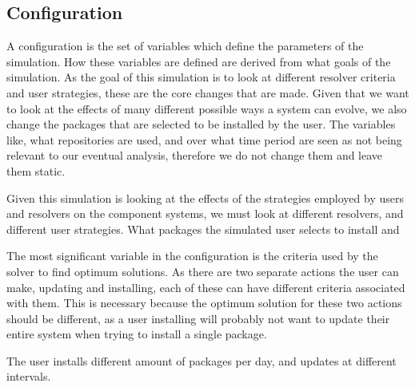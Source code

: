 



\subsection{Configuration}
A configuration is the set of variables which define the parameters of the simulation.
How these variables are defined are derived from what goals of the simulation.
As the goal of this simulation is to look at different resolver criteria and user strategies,
these are the core changes that are made.
Given that we want to look at the effects of many different possible ways a system can evolve,
we also change the packages that are selected to be installed by the user.
The variables like, what repositories are used, and over what time period are seen as not being relevant to our eventual analysis,
therefore we do not change them and leave them static.

Given this simulation is looking at the effects of the strategies employed by users and resolvers on the component systems,
we must look at different resolvers, and different user strategies.
What packages the simulated user selects to install and 

The most significant variable in the configuration is the criteria used by the solver to find optimum solutions. 
As there are two separate actions the user can make, updating and installing, each of these can have different criteria associated with them.
This is necessary because the optimum solution for these two actions should be different,
as a user installing will probably not want to update their entire system when trying to install a single package.

The user installs different amount of packages per day, and updates at different intervals. 

